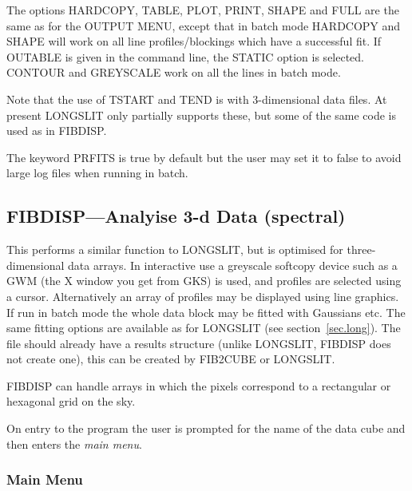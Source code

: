 The options HARDCOPY, TABLE, PLOT, PRINT, SHAPE and FULL are the same
as for the OUTPUT MENU, except that in batch mode HARDCOPY and SHAPE
will work on all line profiles/blockings which have a successful fit.
If OUTABLE is given in the command line, the STATIC option is
selected.
CONTOUR and GREYSCALE work on all the lines in batch mode.

Note that the use of TSTART and TEND is with 3-dimensional data files.
At present LONGSLIT only partially supports these, but some of the same
code is used as in FIBDISP.

The keyword PRFITS is true by default but the user may set it to false
to avoid large log files when running in batch.


\subsection{FIBDISP---Analyise 3-d Data (spectral)}

This performs a similar function to LONGSLIT, but is optimised for
three-dimensional data arrays.
In interactive use a greyscale softcopy device such as a GWM (the X
window you get from GKS) is used, and profiles are selected using a cursor.
Alternatively an
array of profiles may be displayed using line graphics. If run in batch
mode the whole data block may be fitted with Gaussians etc. The same
fitting options are available as for LONGSLIT (see
section~\ref{sec.long}). The file should already have a results
structure (unlike LONGSLIT, FIBDISP does not create one), this can be
created by FIB2CUBE or LONGSLIT.

FIBDISP can handle arrays in which the pixels correspond to a
rectangular or hexagonal grid on the sky.

On entry to the program the user is prompted for the name of the data
cube and then enters the {\em main menu}.

\subsubsection{Main Menu}

